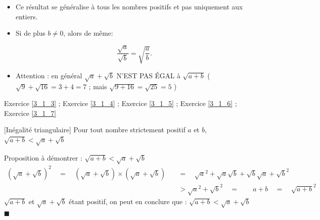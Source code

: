 \begin{rem}{}{}
\begin{itemize}
\item Ce résultat se généralise à tous les nombres positifs et pas uniquement aux entiers.
\item Si de plus $b \ne 0$, alors de même: 

\vspace{-7mm}
\[ \frac{\sqrt{a}}{\sqrt{b}}=\sqrt{\frac{a}{b}}. \]
\item Attention : en général $\sqrt{a} + \sqrt{b}$ N'EST PAS ÉGAL à $\sqrt{a + b}$
\quad($\sqrt{9} + \sqrt{16}= 3 + 4 = 7$ ; mais $\sqrt{9 + 16} = \sqrt{25} = 5$ )
\end{itemize}
\end{rem}

\begin{exec}
\hspace{0.4cm} \hypertarget{Ex_3_1_3}{}  Exercice \ref{3_1_3} \hspace{0.4cm};
\hspace{0.4cm} \hypertarget{Ex_3_1_4}{}  Exercice \ref{3_1_4} \hspace{0.4cm};
\hspace{0.4cm} \hypertarget{Ex_3_1_5}{}  Exercice \ref{3_1_5} \hspace{0.5cm};
\hspace{0.4cm} \hypertarget{Ex_3_1_6}{}  Exercice \ref{3_1_6} \hspace{0.4cm};
\hspace{0.4cm} \hypertarget{Ex_3_1_7}{}  Exercice \ref{3_1_7} \hspace{0.4cm}
\end{exec}

\begin{prop}{}{}[Inégalité triangulaire]
Pour tout nombre strictement positif $a$ et $b$,  $\sqrt{a + b} < \sqrt{a} + \sqrt{b}$
\end{prop}

\begin{deme}{}{}
Proposition à démontrer : $\sqrt{a + b} < \sqrt{a} + \sqrt{b}$
\begin{align*}
\left( \sqrt{a} + \sqrt{b} \right) ^2 \quad = \quad \left( \sqrt{a} + \sqrt{b} \right) \times \left( \sqrt{a} + \sqrt{b} \right) \quad &= \quad \sqrt{a}^2 + \sqrt{a}\sqrt{b} + \sqrt{b}\sqrt{a} + \sqrt{b}^2 \\
&> \sqrt{a}^2 + \sqrt{b}^2 \quad = \quad \quad a+b \quad = \quad \sqrt{a+b} ^2 
\end{align*}
$\sqrt{a+b}$ et $\sqrt{a} + \sqrt{b}$ étant positif, on peut en conclure que :
$\sqrt{a + b} < \sqrt{a} + \sqrt{b}$\hfill $\blacksquare$
\end{deme}

